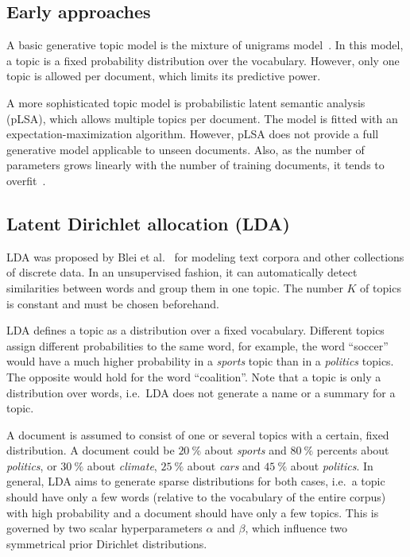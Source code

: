 \documentclass[
        a4paper,
        titlepage,
        twoside,
        parskip
        ]{scrbook}
\theoremstyle{break}
\begin{document}
\subsection{Early approaches}
A basic generative topic model is the mixture of unigrams model~\cite{Nigam2000}.
In this model, a topic is a fixed probability distribution over the vocabulary.
However, only one topic is allowed per document, which limits its predictive power.

A more sophisticated topic model is probabilistic latent semantic analysis (pLSA), which allows multiple topics per document.
The model is fitted with an expectation-maximization algorithm.
However, pLSA does not provide a full generative model applicable to unseen documents.
Also, as the number of parameters grows linearly with the number of training documents, it tends to overfit~\cite{Blei2003}.

\subsection{Latent Dirichlet allocation (LDA)}
LDA was proposed by Blei et al.~\cite{Blei2003} for modeling text corpora and other collections of discrete data.
In an unsupervised fashion, it can automatically detect similarities between words and group them in one topic.
The number $K$ of topics is constant and must be chosen beforehand.

LDA defines a topic as a distribution over a fixed vocabulary.
Different topics assign different probabilities to the same word, for example, the word ``soccer'' would have a much higher probability in a \emph{sports} topic than in a \emph{politics} topics.
The opposite would hold for the word ``coalition''.
Note that a topic is only a distribution over words, i.e.\ LDA does not generate a name or a summary for a topic.

A document is assumed to consist of one or several topics with a certain, fixed distribution.
A document could be $20~\%$ about \emph{sports} and $80~\%$ percents about \emph{politics}, or $30~\%$ about \emph{climate}, $25~\%$ about \emph{cars} and $45~\%$ about \emph{politics}.
In general, LDA aims to generate sparse distributions for both cases, i.e.\ a topic should have only a few words (relative to the vocabulary of the entire corpus) with high probability and a document should have only a few topics.
This is governed by two scalar hyperparameters $\alpha$ and $\beta$, which influence two symmetrical prior Dirichlet distributions.
\end{document}
